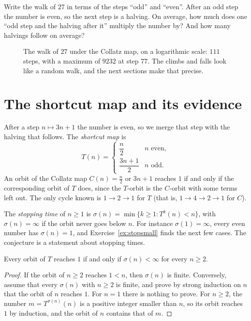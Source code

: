 \begin{think}
Write the walk of $27$ in terms of the steps ``odd'' and ``even''. After an odd step the number is even, so the next step is a halving. On average,
how much does one ``odd step and the halving after it'' multiply the number by? And how many halvings follow on average?
\end{think}

\begin{figure}[ht]
\centering
{}
\caption{The walk of $27$ under the Collatz map, on a logarithmic scale: $111$ steps, with a maximum of $9232$ at step $77$. The climbs and falls
look like a random walk, and the next sections make that precise.}
\label{fig:traj27}
\end{figure}

\section{The shortcut map and its evidence}

After a step $n\mapsto3n+1$ the number is even, so we merge that step with the halving that follows. The \emph{shortcut map} is
\[
T(n)=\begin{cases}\dfrac n2&n\text{ even},\\[2mm]\dfrac{3n+1}2&n\text{ odd}.\end{cases}
\]
An orbit of the Collatz map $C(n)=\frac n2$ or $3n+1$ reaches $1$ if and only if the corresponding orbit of $T$ does, since the $T$-orbit is the
$C$-orbit with some terms left out. The only cycle known is $1\to2\to1$ for $T$ (that is, $1\to4\to2\to1$ for $C$).

The \emph{stopping time} of $n\ge1$ is $\sigma(n)=\min\{k\ge1:T^k(n)<n\}$, with $\sigma(n)=\infty$ if the orbit never goes below $n$. For instance
$\sigma(1)=\infty$, every even number has $\sigma(n)=1$, and Exercise~\ref{ex:stopsmall} finds the next few cases. The conjecture is a statement about
stopping times.

\begin{proposition}\label{prop:stopping}
Every orbit of $T$ reaches $1$ if and only if $\sigma(n)<\infty$ for every $n\ge2$.
\end{proposition}
\begin{proof}
If the orbit of $n\ge2$ reaches $1<n$, then $\sigma(n)$ is finite. Conversely, assume that every $\sigma(n)$ with $n\ge2$ is finite, and prove by strong
induction on $n$ that the orbit of $n$ reaches $1$. For $n=1$ there is nothing to prove. For $n\ge2$, the number $m=T^{\sigma(n)}(n)$ is a positive
integer smaller than $n$, so its orbit reaches $1$ by induction, and the orbit of $n$ contains that of $m$.
\end{proof}

